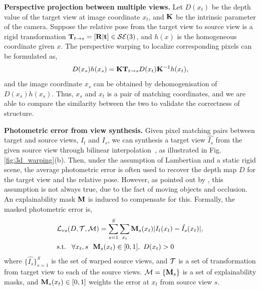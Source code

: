 \textbf{Perspective projection between multiple views.}
Let $D(x_t)$ be the depth value of the target view at image coordinate $x_t$, and ${\mathbf K}$ be the intrinsic parameter of the camera. Suppose the relative pose from the target view to source view is a rigid transformation ${\mathbf T}_{t\rightarrow s} = [{\mathbf R} | {\mathbf t}] \in {\mathcal S}{\mathcal E}(3)$, and $h(x)$ is the homogeneous coordinate given $x$. The perspective warping to localize corresponding pixels can be formulated as, 
\begin{align}
\label{eqn:warp}
D(x_s)h(x_s) = {\mathbf K}{\mathbf T}_{t\rightarrow s}D(x_t){\mathbf K}^{-1}h(x_t),
\end{align}
and the image coordinate $x_s$ can be obtained by dehomogenisation of $D(x_s)h(x_s)$. Thus, $x_s$ and $x_t$ is a pair of matching coordinates, and we are able to compare the similarity between the two to validate the correctness of structure.


\textbf{Photometric error from view synthesis.} 
\label{chap:warping}
Given pixel matching pairs between target and source views, \ie $I_t$ and $I_s$, we can synthesis a target view $\hat{I_s}$ from the given source view through bilinear interpolation~\cite{GargBR16}, as illustrated in Fig. \ref{fig:3d_warping}(b). 
Then, under the assumption of Lambertian and a static rigid scene, the average photometric error is often used to recover the depth map $D$ for the target view and the relative pose. 
However, as pointed out by \cite{zhou2017unsupervised}, this assumption is not always true, due to the fact of moving objects and occlusion. An explainability mask ${\mathbf M}$ is induced to compensate for this. Formally, the masked photometric error is,
\begin{align}
\label{eqn:photometric}
& {\mathcal L}_{vs}(D, {\mathcal T}, {\mathcal M}) = \sum_{s=1}^{S}\sum_{x_t}{\mathbf M}_s(x_t)|I_t(x_t) - \hat{I_s}(x_t)|, \nonumber \\
& \text{s.t. ~} \forall x_t, s\text{~~} {\mathbf M}_s(x_t)\in [0, 1],\text{~} D(x_t) > 0
\end{align}
where $\{\hat{I_s}\}_{s=1}^{S}$ is the set of warped source views, and ${\mathcal T}$ is a set of transformation from target view to each of the source views. 
${\mathcal M} = \{{\mathbf M}_s\}$ is a set of explainability masks, and ${\mathbf M}_s(x_t) \in [0, 1]$ weights the error at $x_t$ from source view $s$.

